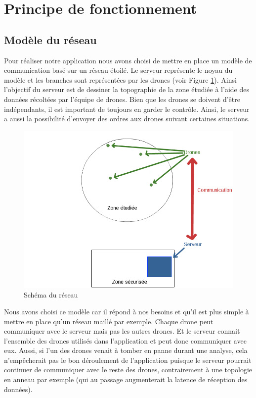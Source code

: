 \documentclass[a4paper,10pt]{report}
\begin{document}
    \section{Principe de fonctionnement}
      \subsection{Modèle du réseau}
	Pour réaliser notre application nous avons choisi de mettre en place un 
modèle de communication basé sur un réseau étoilé. Le serveur représente le 
noyau du modèle et les branches sont représentées par les drones (voir 
Figure \ref{network_schema}). Ainsi l'objectif du serveur est de dessiner la 
topographie de la zone étudiée à l'aide des données récoltées par l'équipe de 
drones. Bien que les drones se doivent d'être indépendants, il est important de 
toujours en garder le contrôle. Ainsi, le serveur a aussi la possibilité 
d'envoyer des ordres aux drones suivant certaines situations.

	\begin{figure}[htbp]
	  \centering
	  \includegraphics[scale=0.4]{img/projet_schema.png}
	  \caption{Schéma du réseau}
	  \label{network_schema}
	\end{figure}
	
	\newpage
	
	Nous avons choisi ce modèle car il répond à nos besoins et qu'il est 
plus simple à mettre en place qu'un réseau maillé par exemple. Chaque 
drone peut communiquer avec le serveur mais pas les autres drones. Et le 
serveur connait l'ensemble des drones utilisés dans l'application et peut 
donc communiquer avec eux. Aussi, si l'un des drones venait à tomber en panne 
durant une analyse, cela n'empêcherait pas le bon déroulement de l'application 
puisque le serveur pourrait continuer de communiquer avec le reste des drones, 
contrairement à une topologie en anneau par exemple (qui au passage augmenterait 
la latence de réception des données).
      
\end{document}
